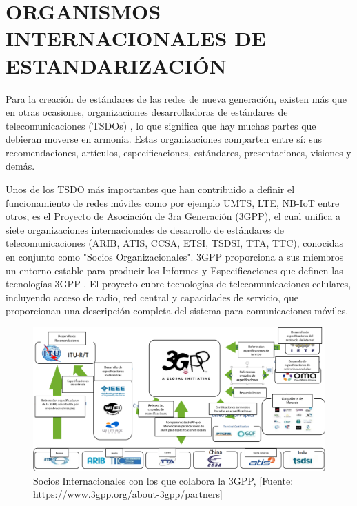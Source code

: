 \section{ORGANISMOS INTERNACIONALES DE ESTANDARIZACIÓN}

Para la creación de estándares de las redes de nueva generación, existen más que en otras ocasiones, organizaciones desarrolladoras de estándares de telecomunicaciones (TSDOs) \parencite{3GPP2019}, lo que significa que hay muchas partes que debieran moverse en armonía. Estas organizaciones comparten entre sí: sus recomendaciones, artículos, especificaciones, estándares, presentaciones, visiones y demás. \newline

Unos de los TSDO más importantes que han contribuido a definir el funcionamiento de redes móviles como por ejemplo UMTS, LTE, NB-IoT entre otros, es el Proyecto de Asociación de 3ra Generación (3GPP), el cual unifica a siete organizaciones internacionales de desarrollo de estándares de telecomunicaciones (ARIB, ATIS, CCSA, ETSI, TSDSI, TTA, TTC), conocidas en conjunto como "Socios Organizacionales". 3GPP proporciona a sus miembros un entorno estable para producir los Informes y Especificaciones que definen las tecnologías 3GPP \parencite{3GPP2019}. El proyecto cubre tecnologías de telecomunicaciones celulares, incluyendo acceso de radio, red central y capacidades de servicio, que proporcionan una descripción completa del sistema para comunicaciones móviles. \newline


\begin{figure}[th]
\centering
\includegraphics[scale=.5]{Figures/Socios Internacionales con los que colabora la 3GPP}
\decoRule
\caption[Socios Internacionales con los que colabora la 3GPP]{Socios Internacionales con los que colabora la 3GPP, [Fuente: https://www.3gpp.org/about-3gpp/partners]}
\label{fig:socios}
\end{figure}

